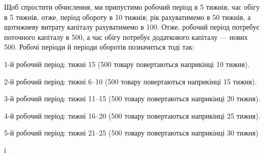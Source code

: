 Щоб спростити обчислення, ми припустимо робочий період в 5 тижнів,
час обігу в 5 тижнів, отже, період обороту в 10 тижнів; рік рахуватимемо
в 50 тижнів, а щотижневу витрату капіталу рахуватимемо в 100. Отже, робочий період потребує поточного капіталу в 500,
а час обігу потребує додаткового капіталу — нових 500. Робочі
періоди й періоди оборотів позначиться тоді так:

\noindent{}
{\settablefont{}1-й робочий період: тижні 1\textendash{}5 (500 товару повертаються
наприкінці 10 тижня).}

\noindent{}
{\settablefont{}2-й робочий період: тижні 6--10 (500 товару повертаються
наприкінці 15 тижня).}

\noindent{}
{\settablefont{}3-й робочий період: тижні 11--15 (500 товару повертаються
наприкінці 20 тижня).}

\noindent{}
{\settablefont{}4-й робочий період: тижні 16--20 (500 товару повертаються
наприкінці 25 тижня).}

\noindent{}
{\settablefont{}5-й робочий період: тижні 21--25 (500 товару повертаються
наприкінці 30 тижня)

\noindent{}і~}